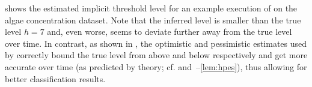  shows the estimated implicit threshold
level for an example execution of \istr on the algae concentration
dataset. Note that the inferred level
is smaller than the true level $h = 7$ and, even worse, seems to
deviate further away from the true level over time.
In contrast, as shown in , the optimistic
and pessimistic estimates used by \iacl correctly bound the true level
from above and below respectively and get more accurate over time
(as predicted by theory; cf. 
and~--\ref{lem:hpes}),
thus allowing for better classification results.

%
%
%
%
%
%
\renewcommand\trimlen{2pt}
